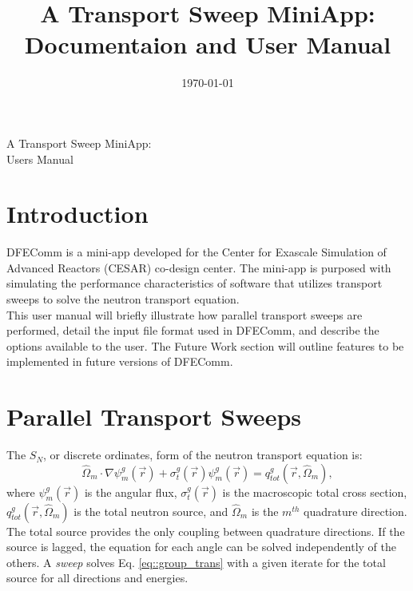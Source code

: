 \documentclass{article}
\date{\today}
\title{\Huge{A Transport Sweep MiniApp:} \\ {\Large Documentaion and User Manual}}
\begin{document}
  \begin{titlepage}
    \vspace*{\fill}
    \begin{center}
      {\Huge{A Transport Sweep MiniApp:}}\\[0.5cm]
      {\huge {Users Manual}}\\[0.5cm]
    \end{center}
    \vspace*{\fill}
  \end{titlepage}

%
\section{Introduction}
%
DFEComm is a mini-app developed for the Center for Exascale Simulation of Advanced Reactors (CESAR) co-design center. The mini-app is purposed with simulating the performance characteristics of software that utilizes transport sweeps to solve the neutron transport equation. \\

This user manual will briefly illustrate how parallel transport sweeps are performed, detail the input file format used in DFEComm, and describe the options available to the user. The Future Work section will outline features to be implemented in future versions of DFEComm.


\section{Parallel Transport Sweeps}
The $S_N$, or discrete ordinates, form of the neutron transport equation is:
\begin{equation}
  \hat \Omega_m \cdot \nabla \psi_m^g ( \vec r )  + \sigma_t^g ( \vec r ) \psi_m^g ( \vec r) = q_{tot}^g(\vec r,\hat \Omega_m),
\label{eq::group_trans}
\end{equation}
where $\psi_m^g ( \vec r )$ is the angular flux, $\sigma_t^g ( \vec r )$ is the macroscopic total cross section, $ q_{tot}^g(\vec r,\hat \Omega_m)$ is the total neutron source, and $\hat \Omega_m$ is the $m^{th}$ quadrature direction. The total source provides the only coupling between quadrature directions. If the source is lagged, the equation for each angle can be solved independently of the others. A \emph{sweep} solves Eq. \ref{eq::group_trans} with a given iterate for the total source for all directions and energies. \\
\end{document}
